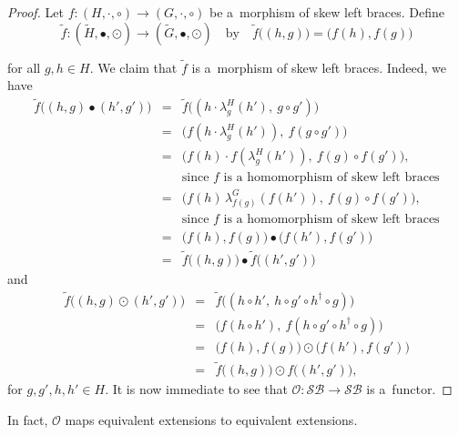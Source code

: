 \documentclass{jonasart}
\theoremstyle{plain}
\begin{document}
	\begin{proof}
		Let $f\colon (H,\cdot,\circ)\to(G,\cdot,\circ)$ be a~morphism of skew left braces. Define
		\[
		\tilde{f}: (\tilde{H},\bullet,\odot)\to (\tilde{G},\bullet,\odot)
		\quad \text{by} \quad \widetilde{f}\big((h,g)\big)=\big(f(h),f(g)\big)\] 
		
		for all $g, h \in H$. We claim that $\widetilde{f}$ is a~morphism of skew left braces. Indeed, we have
		\begin{eqnarray*}
			\widetilde{f} \big((h,g)\bullet(h',g') \big)&=&\widetilde{f} \big((h \cdot \lambda^H_g (h'),~g\circ g')\big)\\
			&=& \big(f(h \cdot \lambda^H_g (h')),~f(g\circ g')\big)\\
			&=& \big(f(h) \cdot f(\lambda^H_g (h')),~f(g)\circ f(g') \big),\\
			&&\text{since $f$ is a homomorphism of skew left braces}\\
			&=& \big(f(h)\, \lambda^G_{f(g)}(f(h')),~f(g)\circ f(g') \big),\\
			&&\text{since $f$ is a homomorphism of skew left braces}\\
			&=& \big(f(h),f(g) \big)\bullet \big(f(h'),f(g') \big)\\
			&=&\widetilde{f}\big((h,g)\big) \bullet \widetilde{f}\big((h',g')\big)
		\end{eqnarray*}
		and
		\begin{eqnarray*}
			\widetilde{f} \big((h,g)\odot (h',g') \big)&=&\widetilde{f} \big((h\circ h',~h\circ g'\circ h^\dagger\circ g)\big)\\
			&=&	\big(f(h\circ h'),~f(h\circ g'\circ h^\dagger\circ g) \big)\\
			&=& \big(f(h),f(g) \big)\odot \big(f(h'),f(g') \big)\\
			&=&\widetilde{f} \big((h,g)\big)\odot {f} \big((h',g')\big),
		\end{eqnarray*}
		for $g,g', h,h' \in H$. It is now immediate to see that $\mathcal{O}: \mathcal{SB} \to \mathcal{SB}$ is a~functor.
	\end{proof}
	
	In fact, $\mathcal{O}$ maps equivalent extensions to equivalent extensions.
	
\end{document}
